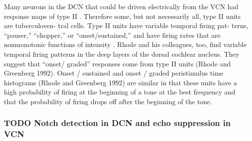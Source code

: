  Many neurons in the DCN that could be driven electrically
 from the VCN had response maps of type II \citep{Young:1980}.
Therefore
 some, but not necessarily all, type II units are tuberculoven-
 tral cells. Type II units have variable temporal firing pat-
 terns, “pauser,” “chopper,” or “onset/sustained,”
 and have firing rates that are nonmonotonic
 functions of intensity \citep{ShofnerYoung:1985}. Rhode and his colleagues,
 too, find variable temporal firing patterns in the deep layers
 of the dorsal cochlear nucleus. They suggest that “onset/
 graded” responses come from type II units (Rhode and
 Greenberg 1992). Onset / sustained \citep{ShofnerYoung:1985} and onset / graded peristimulus
 time histograms (Rhode and Greenberg 1992) are similar in that these units
 have a high probability of firing at the beginning of a tone at
 the best frequency and that the probability of firing drops
 off after the beginning of the tone.



\subsubsection{TODO Notch detection in DCN and echo suppression in VCN}







